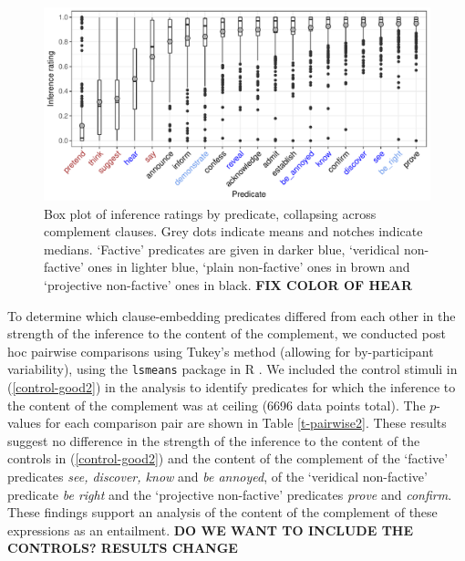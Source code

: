 \documentclass[11pt,fleqn]{article}
\newcommand{\6}{\mbox{$[\hspace*{-.6mm}[$}}
\newcommand{\9}{\mbox{$]\hspace*{-.6mm}]$}}
\begin{document}
\begin{figure}[h!]
\centering

\includegraphics[width=.75\paperwidth]{../results/4-veridicality3/graphs/boxplot-inference}

\caption{Box plot of inference ratings by predicate, collapsing across complement clauses. Grey dots indicate means and notches indicate medians. `Factive' predicates are given in darker blue, `veridical non-factive' ones in lighter blue, `plain non-factive' ones in brown and `projective non-factive' ones in black. {\bf FIX COLOR OF HEAR}}
\label{f-veridicality-predicate2}
\end{figure}

To determine which clause-embedding predicates differed from each other in the strength of the inference to the content of the  complement, we conducted post hoc pairwise comparisons using Tukey's method (allowing for by-participant variability), using the \verb|lsmeans| package \citep{tukey} in R \citep{r}. We included the control stimuli in (\ref{control-good2}) in the analysis to identify predicates for which the inference to the content of the complement was at ceiling (6696 data points total). The $p$-values for each comparison pair are shown in Table  \ref{t-pairwise2}. These results suggest no difference in the strength of the inference to the content of the controls in (\ref{control-good2}) and the content of the complement of the `factive' predicates {\em see, discover, know} and {\em be annoyed}, of the `veridical non-factive' predicate {\em be right} and the `projective non-factive' predicates {\em prove} and {\em confirm}. These findings support an analysis of the content of the complement of these expressions as an entailment.  {\bf DO WE WANT TO INCLUDE THE CONTROLS? RESULTS CHANGE}
\end{document}
